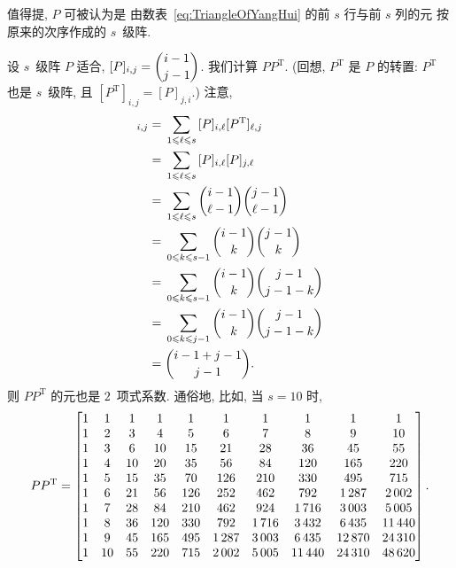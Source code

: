 \documentclass[../libro.tex]{subfiles}
\begin{document}
值得提, \(P\) 可被认为是%
由数表~\eqref{eq:TriangleOfYangHui} 的前 \(s\) 行与前 \(s\) 列的元%
按原来的次序作成的 \(s\)~级阵.

\begin{example}
    设 \(s\)~级阵 \(P\) 适合,
    \([P]_{i,j} = \dbinom{i-1}{j-1}\).
    我们计算 \(P P^{\mathrm{T}}\).
    (回想, \(P^{\mathrm{T}}\) 是 \(P\) 的转置: %
    \(P^{\mathrm{T}}\) 也是 \(s\)~级阵,
    且 \([P^{\mathrm{T}}]_{i,j} = [P]_{j,i}\).) %
    注意,
    \begin{align*}
        [P P^{\mathrm{T}}]_{i,j}
        = {} &
        \sum_{1 \leq \ell \leq s} {[P]_{i,\ell} [P^{\mathrm{T}}]_{\ell,j}}
        \\
        = {} &
        \sum_{1 \leq \ell \leq s} {[P]_{i,\ell} [P]_{j,\ell}}
        \\
        = {} &
        \sum_{1 \leq \ell \leq s} {\dbinom{i-1}{\ell-1} \dbinom{j-1}{\ell-1}}
        \\
        = {} &
        \sum_{0 \leq k \leq s-1} {\dbinom{i-1}{k} \dbinom{j-1}{k}}
        \\
        = {} &
        \sum_{0 \leq k \leq s-1} {\dbinom{i-1}{k} \dbinom{j-1}{j-1-k}}
        \\
        = {} &
        \sum_{0 \leq k \leq j-1} {\dbinom{i-1}{k} \dbinom{j-1}{j-1-k}}
        \\
        = {} &
        \dbinom{i-1+j-1}{j-1}.
    \end{align*}
    则 \(P P^{\mathrm{T}}\) 的元也是 \(2\)~项式系数.
    通俗地, 比如, 当 \(s = 10\) 时,
    \begin{equation*}
        P P^{\mathrm{T}} =
        \begin{bmatrix}
            1 & 1  & 1  & 1   & 1   & 1      & 1      & 1       & 1       & 1       \\
            1 & 2  & 3  & 4   & 5   & 6      & 7      & 8       & 9       & 10      \\
            1 & 3  & 6  & 10  & 15  & 21     & 28     & 36      & 45      & 55      \\
            1 & 4  & 10 & 20  & 35  & 56     & 84     & 120     & 165     & 220     \\
            1 & 5  & 15 & 35  & 70  & 126    & 210    & 330     & 495     & 715     \\
            1 & 6  & 21 & 56  & 126 & 252    & 462    & 792     & 1\,287  & 2\,002  \\
            1 & 7  & 28 & 84  & 210 & 462    & 924    & 1\,716  & 3\,003  & 5\,005  \\
            1 & 8  & 36 & 120 & 330 & 792    & 1\,716 & 3\,432  & 6\,435  & 11\,440 \\
            1 & 9  & 45 & 165 & 495 & 1\,287 & 3\,003 & 6\,435  & 12\,870 & 24\,310 \\
            1 & 10 & 55 & 220 & 715 & 2\,002 & 5\,005 & 11\,440 & 24\,310 & 48\,620 \\
        \end{bmatrix}.
        \qedhere
    \end{equation*}
\end{example}
\end{document}
